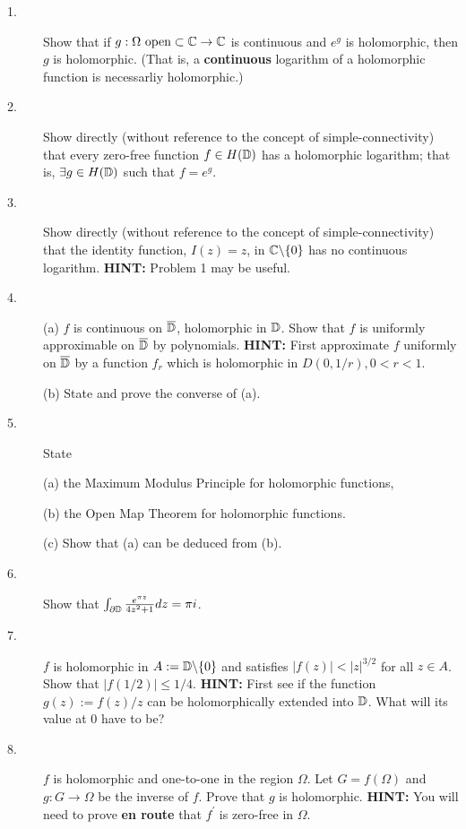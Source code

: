 \documentclass{article}
\begin{document}
\begin{description}
\item[1.]
Show that if $g: \Omega \hbox{\ open} \subset \Bbb C \to \Bbb C$
is continuous and $e^g$ is holomorphic,
then $g$ is holomorphic. (That is, a {\bf continuous} logarithm of a
holomorphic function is necessarliy holomorphic.)

\item[2.]
Show directly (without reference to the concept of simple-connectivity) that
every zero-free function $f \in H(\Bbb D)$ has a holomorphic logarithm;
that is, $\exists g \in H(\Bbb D)$ such that $f = e^g$.

\item[3.]
Show directly (without reference to the concept of simple-connectivity) that
the identity function, $I(z) = z$, in $\Bbb C \backslash \{0\}$ has no
continuous logarithm. {\bf HINT:} Problem 1 may be useful.

\item[4.] (a)
$f$ is continuous on $\overline{\Bbb D}$, holomorphic in $\Bbb D$. Show that
$f$ is uniformly approximable on $\overline{\Bbb D}$ by polynomials.
{\bf HINT:} First approximate $f$ uniformly on $\overline{\Bbb D}$ by a
function $f_r$ which is holomorphic in $D(0,1/r), 0 < r< 1$.

\item[\quad] (b)
State and prove the converse of (a).

\item[5.]
State

\item[\quad] (a)
the Maximum Modulus Principle for holomorphic functions,

\item[\quad] (b)
the Open Map Theorem for holomorphic functions.

\item[\quad] (c)
Show that (a) can be deduced from (b).

\item[6.]
Show that $\int_{\partial \Bbb D} \frac{e^{\pi z}}{4z^2 + 1} dz = \pi i$.

\item[7.]
$f$ is holomorphic in $A:= \Bbb D \backslash \{0\}$ and satisfies
$|f(z)| < |z|^{3/2}$ for all $z \in A$. Show that
$|f(1/2)| \leq 1/4$. {\bf HINT:} First see if the function
$g(z) := f(z)/z$ can be holomorphically extended into $\Bbb D$. What will
its value at 0 have to be?

\item[8.]
$f$ is holomorphic and one-to-one in the region $\Omega$. Let $G =f(\Omega)$
and $g : G \to \Omega$ be the inverse of $f$. Prove that $g$ is holomorphic.
{\bf HINT:} You will need to prove {\bf en route} that $f^\prime$ is
zero-free in $\Omega$.


\end{description}
\end{document}
